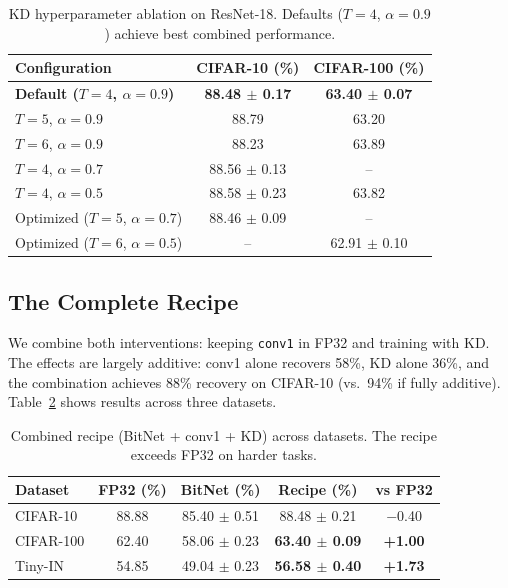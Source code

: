\documentclass[10pt]{article}
\begin{document}
\begin{table}[ht]
\centering
\caption{KD hyperparameter ablation on ResNet-18. Defaults ($T=4$, $\alpha=0.9$) achieve best combined performance.}
\label{tab:kd_ablation}
\small
\begin{tabular}{lcc}
\toprule
Configuration & CIFAR-10 (\%) & CIFAR-100 (\%) \\
\midrule
\textbf{Default ($T=4$, $\alpha=0.9$)} & \textbf{88.48 $\pm$ 0.17} & \textbf{63.40 $\pm$ 0.07} \\
$T=5$, $\alpha=0.9$ & 88.79 & 63.20 \\
$T=6$, $\alpha=0.9$ & 88.23 & 63.89 \\
$T=4$, $\alpha=0.7$ & 88.56 $\pm$ 0.13 & -- \\
$T=4$, $\alpha=0.5$ & 88.58 $\pm$ 0.23 & 63.82 \\
Optimized ($T=5$, $\alpha=0.7$) & 88.46 $\pm$ 0.09 & -- \\
Optimized ($T=6$, $\alpha=0.5$) & -- & 62.91 $\pm$ 0.10 \\
\bottomrule
\end{tabular}
\end{table}

\subsection{The Complete Recipe}

We combine both interventions: keeping \texttt{conv1} in FP32 and training with KD. The effects are largely additive: conv1 alone recovers 58\%, KD alone 36\%, and the combination achieves 88\% recovery on CIFAR-10 (vs.~94\% if fully additive). Table~\ref{tab:recipe_short} shows results across three datasets.

\begin{table}[ht]
\centering
\caption{Combined recipe (BitNet + conv1 + KD) across datasets. The recipe exceeds FP32 on harder tasks.}
\label{tab:recipe_short}
\small
\begin{tabular}{lcccc}
\toprule
Dataset & FP32 (\%) & BitNet (\%) & Recipe (\%) & vs FP32 \\
\midrule
CIFAR-10 & 88.88 & 85.40 $\pm$ 0.51 & 88.48 $\pm$ 0.21 & $-$0.40 \\
CIFAR-100 & 62.40 & 58.06 $\pm$ 0.23 & \textbf{63.40 $\pm$ 0.09} & \textbf{+1.00} \\
Tiny-IN & 54.85 & 49.04 $\pm$ 0.23 & \textbf{56.58 $\pm$ 0.40} & \textbf{+1.73} \\
\bottomrule
\end{tabular}
\end{table}
\end{document}
